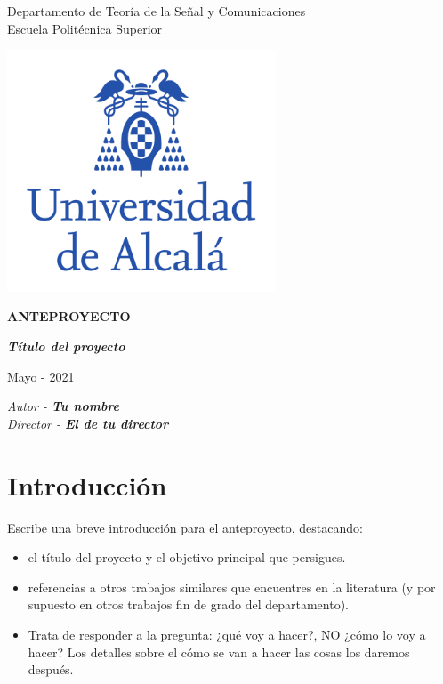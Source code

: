 \documentclass[12pt,oneside,a4paper]{article}
\begin{document}
\thispagestyle{empty}

\begin{center}

\begin{large}
Departamento de Teoría de la Señal y Comunicaciones\\
Escuela Politécnica Superior\\
\end{large}
\vspace{1cm}

\includegraphics[width=8cm]{figuras/logo-uah.pdf}

\textbf{ANTEPROYECTO}

\vspace{1cm}

\begin{large}\textbf{\textit{Título del proyecto}}\end{large}

\vfill

Mayo - 2021

\end{center}

\begin{flushright}
\textit{Autor - \textbf{Tu nombre}} \\
\textit{Director - \textbf{El de tu director}}
\end{flushright}

\newpage

\section{Introducción}

Escribe una breve introducción para el anteproyecto, destacando:
\begin{itemize}
 \item el título del proyecto y el objetivo principal que persigues.
 \item referencias a otros trabajos similares que encuentres en la literatura (y por supuesto en otros trabajos fin de grado del departamento).
 \item Trata de responder a la pregunta: ¿qué voy a hacer?, NO ¿cómo lo voy a hacer? Los detalles sobre el cómo se van a hacer las cosas los daremos después.
\end{itemize}
\end{document}
